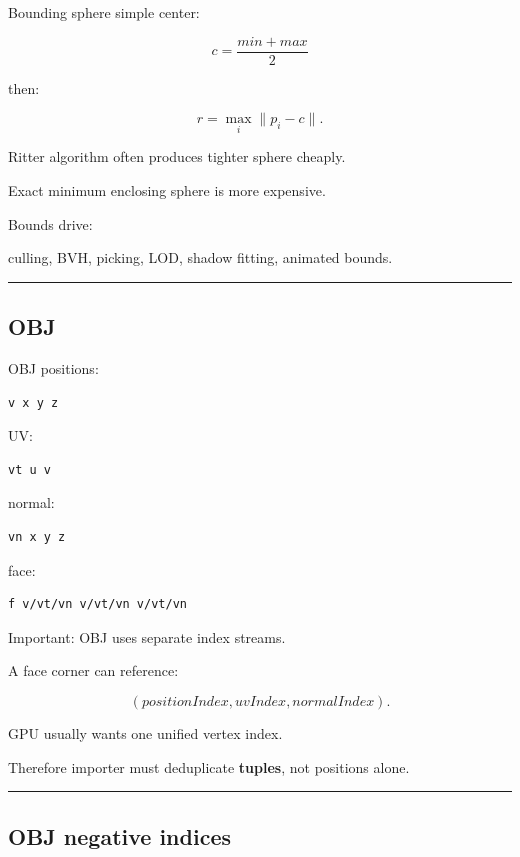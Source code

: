 Bounding sphere simple center:

\[
c=
\frac{min+max}{2}
\]

then:

\[
r=
\max_i\|p_i-c\|.
\]

Ritter algorithm often produces tighter sphere cheaply.

Exact minimum enclosing sphere is more expensive.

Bounds drive:

culling, BVH, picking, LOD, shadow fitting, animated bounds.

\begin{center}\rule{0.5\linewidth}{0.5pt}\end{center}

\subsection{OBJ}\label{04-visual-computing-ii-ch041-obj}

OBJ positions:

\begin{verbatim}
v x y z
\end{verbatim}

UV:

\begin{verbatim}
vt u v
\end{verbatim}

normal:

\begin{verbatim}
vn x y z
\end{verbatim}

face:

\begin{verbatim}
f v/vt/vn v/vt/vn v/vt/vn
\end{verbatim}

Important: OBJ uses separate index streams.

A face corner can reference:

\[
(positionIndex,
uvIndex,
normalIndex).
\]

GPU usually wants one unified vertex index.

Therefore importer must deduplicate \textbf{tuples}, not positions alone.

\begin{center}\rule{0.5\linewidth}{0.5pt}\end{center}

\subsection{OBJ negative indices}\label{04-visual-computing-ii-ch041-obj-negative-indices}

